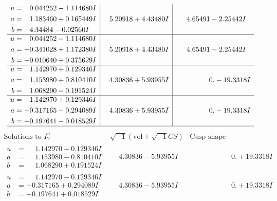 \documentclass[1p]{elsarticle_modified}
\theoremstyle{definition}
\newcommand{\I}{\sqrt{-1}}
\begin{document}
$$\begin{array}{c|c|c}
\begin{aligned}
u &= \phantom{-}0.044252 - 1.114680 I \\
a &= \phantom{-}1.183460 + 0.165449 I \\
b &= \phantom{-}4.34484 - 0.02560 I\end{aligned}
 & \phantom{-}5.20918 + 4.43480 I & \phantom{-}4.65491 - 2.25442 I \\ \hline\begin{aligned}
u &= \phantom{-}0.044252 - 1.114680 I \\
a &= -0.341028 + 1.172380 I \\
b &= -0.010640 + 0.375629 I\end{aligned}
 & \phantom{-}5.20918 + 4.43480 I & \phantom{-}4.65491 - 2.25442 I \\ \hline\begin{aligned}
u &= \phantom{-}1.142970 + 0.129346 I \\
a &= \phantom{-}1.153980 + 0.810410 I \\
b &= \phantom{-}1.068290 - 0.191524 I\end{aligned}
 & \phantom{-}4.30836 + 5.93955 I & \phantom{-0.000000 } 0. - 19.3318 I \\ \hline\begin{aligned}
u &= \phantom{-}1.142970 + 0.129346 I \\
a &= -0.317165 - 0.294089 I \\
b &= -0.197641 - 0.018529 I\end{aligned}
 & \phantom{-}4.30836 + 5.93955 I & \phantom{-0.000000 } 0. - 19.3318 I\\
 \hline 
 \end{array}$$\newpage$$\begin{array}{c|c|c}  
\text{Solutions to }I^u_{2}& \I (\text{vol} + \sqrt{-1}CS) & \text{Cusp shape}\\
 \hline 
\begin{aligned}
u &= \phantom{-}1.142970 - 0.129346 I \\
a &= \phantom{-}1.153980 - 0.810410 I \\
b &= \phantom{-}1.068290 + 0.191524 I\end{aligned}
 & \phantom{-}4.30836 - 5.93955 I & \phantom{-0.000000 -}0. + 19.3318 I \\ \hline\begin{aligned}
u &= \phantom{-}1.142970 - 0.129346 I \\
a &= -0.317165 + 0.294089 I \\
b &= -0.197641 + 0.018529 I\end{aligned}
 & \phantom{-}4.30836 - 5.93955 I & \phantom{-0.000000 -}0. + 19.3318 I \\ \hline\begin{aligned}

\end{aligned}
\end{array}$$
\end{document}
